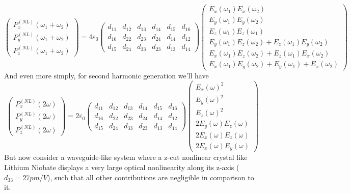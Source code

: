\begin{equation}
\begin{pmatrix}
    P^{(NL)}_x(\omega_1+\omega_2) \\P^{(NL)}_y(\omega_1+\omega_2)\\P^{(NL)}_z(\omega_1+\omega_2)\end{pmatrix}=4\varepsilon_0
    \begin{pmatrix}
        d_{11} & d_{12} & d_{13} & d_{14} & d_{15} & d_{16}\\
        d_{16} & d_{22} & d_{23} & d_{24} & d_{14} & d_{12}\\
        d_{15} & d_{24} & d_{33} & d_{23} & d_{13} & d_{14}
    \end{pmatrix}\begin{pmatrix}
        E_x(\omega_1)E_x(\omega_2)\\
        E_y(\omega_1)E_y(\omega_2)\\
        E_z(\omega_1)E_z(\omega_1)\\
        E_y(\omega_1)E_z(\omega_2)+E_z(\omega_1)E_y(\omega_2)\\
        E_x(\omega_1)E_z(\omega_2)+E_z(\omega_1)E_x(\omega_2)\\
        E_x(\omega_1)E_y(\omega_2)+E_y(\omega_1)+E_x(\omega_2)
    \end{pmatrix}
\end{equation}
And even more simply, for second harmonic generation we'll have
\begin{equation}
\begin{pmatrix}
    P^{(NL)}_x(2\omega) \\P^{(NL)}_y(2\omega)\\P^{(NL)}_z(2\omega)\end{pmatrix}=2\varepsilon_0
    \begin{pmatrix}
        d_{11} & d_{12} & d_{13} & d_{14} & d_{15} & d_{16}\\
        d_{16} & d_{22} & d_{23} & d_{24} & d_{14} & d_{12}\\
        d_{15} & d_{24} & d_{33} & d_{23} & d_{13} & d_{14}
    \end{pmatrix}\begin{pmatrix}
        E_x(\omega)^2\\
        E_y(\omega)^2\\
        E_z(\omega)^2\\
        2E_y(\omega)E_z(\omega)\\
        2E_x(\omega)E_z(\omega)\\
        2E_x(\omega)E_y(\omega)
    \end{pmatrix}
\end{equation}
But now consider a waveguide-like system where a z-cut nonlinear crystal like Lithium Niobate displays a very large optical nonlinearity along its z-axis ($d_{33} = 27 pm/V$), such that all other contributions are negligible in comparison to it.

